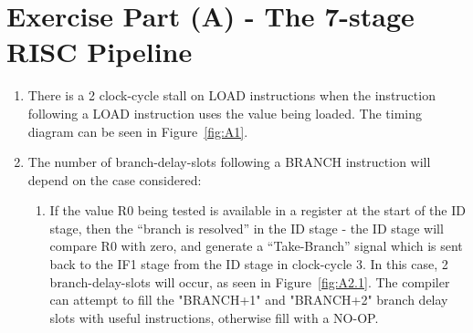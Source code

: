 \section*{Exercise Part (A) - The 7-stage RISC Pipeline}

\begin{enumerate}[wide, label=(A\arabic*)]

\item 
There is a 2 clock-cycle stall on LOAD instructions when the instruction following a LOAD instruction uses the value being loaded. The timing diagram can be seen in Figure~\ref{fig:A1}.

\item
The number of branch-delay-slots following a BRANCH instruction will depend on the case considered:
\begin{enumerate}[wide, label=\arabic*.]
\item If the value R0 being tested is available in a register at the start of the ID stage, then the “branch is resolved” in the ID stage - the ID stage will compare R0 with zero, and generate a “Take-Branch” signal which is sent back to the IF1 stage from the ID stage in clock-cycle 3. In this case, 2 branch-delay-slots will occur, as seen in Figure~\ref{fig:A2.1}. The compiler can attempt to fill the "BRANCH+1" and "BRANCH+2" branch delay slots with useful instructions, otherwise fill with a NO-OP. 


\end{enumerate}
\end{enumerate}
